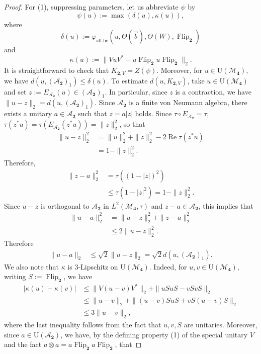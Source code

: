 \documentclass[12pt]{amsart}
\numberwithin{equation}{section}
\theoremstyle{definition}
\def\M{\mathcal{M}}
\def \M{\mathcal{M}}
\def \A{\mathcal{A}}
\begin{document}
\begin{proof}
For (1), suppressing parameters, let us abbreviate $\psi$ by
\[\psi(u):=\max(\delta(u),\kappa(u)),\]
where 
\[\delta(u):=\varphi_{\operatorname{aff,bc}}(u,\Theta(\vec{b}),\Theta(W),\operatorname{Flip}_{\mathbf{2}})
\]
and 
\[\kappa(u):=\|VuV^*-u\operatorname{Flip}_{\mathbf{2}}u\operatorname{Flip}_{\mathbf{2}}\|_2.\]
It is straightforward to check that $K_{\mathbf{2},V}=Z(\psi)$. Moreover, for $u\in \mathrm{U}(\M_{\mathbf{4}})$, we have $d(u,(\A_{\mathbf{2}})_1)\le \delta(u)$.
To estimate $d(u,K_{\mathbf{2},V})$, take $u\in \mathrm{U}(\M_{\mathbf{4}})$ and set $z:=E_{\A_{\mathbf{2}}}(u)\in (\A_\mathbf{2})_1$. In particular, since $z$ is a contraction, we have 
$\|u-z\|_2=d(u,(\A_{\mathbf{2}})_1).$
Since $\A_{\mathbf{2}}$ is a finite von Neumann algebra, there exists a unitary $a\in \A_{\mathbf{2}}$ such that $z=a|z|$ holds. Since $\tau\circ E_{\A_{\mathbf{2}}}=\tau$, $\tau(z^*u)=\tau(E_{\A_{\mathbf{2}}}(z^*u))=\|z\|_2^2$, so that 
\begin{align*}
    \|u-z\|_2^2&=\|u\|_2^2+\|z\|_2^2-2\operatorname{Re}\tau(z^*u)\\
    &=1-\|z\|_2^2.
\end{align*}
Therefore,
\begin{align*}
    \|z-a\|_2^2&=\tau((1-|z|)^2)\\
    &\le \tau(1-|z|^2)=1-\|z\|_2^2.
\end{align*}
Since $u-z$ is orthogonal to $\A_{\mathbf{2}}$ in $L^2(\M_{\mathbf{4}},\tau)$ and $z-a\in \A_{\mathbf{2}}$, this implies that 
\begin{align*}
    \|u-a\|_2^2&=\|u-z\|_2^2+\|z-a\|_2^2\\
    &\le 2\|u-z\|_2^2.
\end{align*}
Therefore 
\begin{align*}
    \|u-a\|_2&\le \sqrt{2}\|u-z\|_2=\sqrt{2}d(u,(\A_{\mathbf{2}})_1).
\end{align*}
We also note that $\kappa$ is $3$-Lipschitz on 
$\mathrm{U}(\M_{\mathbf{4}})$. Indeed, for $u,v\in \mathrm{U}(\M_{\mathbf{4}})$,
writing $S:=\operatorname{Flip}_{\mathbf{2}}$, we have
\[
\begin{aligned}
|\kappa(u)-\kappa(v)|
&\leq \|V(u-v)V^*\|_2
     +\|uSuS-vSvS\|_2\\
&\leq \|u-v\|_2
     +\|(u-v)SuS+vS(u-v)S\|_2\\
&\leq 3\|u-v\|_2,
\end{aligned}
\]
where the last inequality follows from the fact that
$u,v,S$ are unitaries. Moreover, since $a\in \mathrm{U}(\A_{\mathbf{2}})$, we have, by the defining property (1) of the special unitary $V$ and the fact $a\otimes a=a\operatorname{Flip}_{\mathbf{2}}a\operatorname{Flip}_{\mathbf{2}}$, that 

\end{proof}
\end{document}
